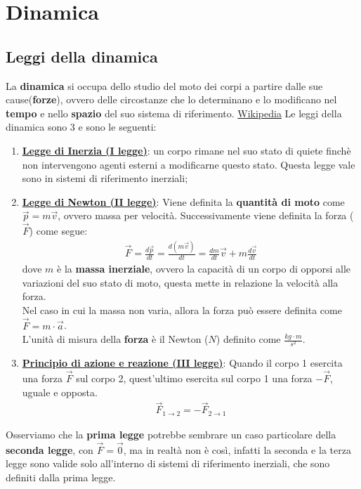 \section{Dinamica}
    \subsection{Leggi della dinamica}
        La \textbf{dinamica} si occupa dello studio del moto dei corpi a partire dalle sue cause(\textbf{forze}), ovvero delle circostanze che lo determinano e lo modificano nel \textbf{tempo} e nello \textbf{spazio} del suo sistema di riferimento. \href{https://it.wikipedia.org/wiki/Dinamica}{Wikipedia}
        Le leggi della dinamica sono 3 e sono le seguenti:
        \begin{enumerate}
            \item \underline{\textbf{Legge di Inerzia (I legge)}}: un corpo rimane nel suo stato di quiete finchè non intervengono agenti esterni a modificarne questo stato. Questa legge vale sono in sistemi di riferimento inerziali;\\
            \item \underline{\textbf{Legge di Newton (II legge)}}: \label{II_legge_dinamica}
            Viene definita la \textbf{quantità di moto} come $\vec{p}=m\vec{v}$, ovvero massa per velocità. Successivamente viene definita la forza ($\vec{F}$) come segue:
            \begin{align*}
                \vec{F}=\frac{d\vec{p}}{dt}=\frac{d(m\vec{v})}{dt}=\frac{dm}{dt}\vec{v} + m\frac{d\vec{v}}{dt}
            \end{align*}
            dove $m$ è la \textbf{massa inerziale}, ovvero la capacità di un corpo di opporsi alle variazioni del suo stato di moto, questa mette in relazione la velocità alla forza.\\
            Nel caso in cui la massa non varia, allora la forza può essere definita come $\vec{F}=m\cdot\vec{a}$.\\
            L'unità di misura della \textbf{forza} è il Newton ($N$) definito come $\frac{kg\cdot m}{s^2}$.\\
            \item \underline{\textbf{Principio di azione e reazione (III legge)}}: \label{IIILeggeDinamica} Quando il corpo 1 esercita una forza $\vec{F}$ sul corpo 2, quest'ultimo esercita sul corpo 1 una forza $-\vec{F}$, uguale e opposta.
            \begin{align*}
                \vec{F}_{1\rightarrow 2}=-\vec{F}_{2\rightarrow 1}
            \end{align*}
        \end{enumerate}
        Osserviamo che la \textbf{prima legge} potrebbe sembrare un caso particolare della \textbf{seconda legge}, con $\vec{F}=\vec{0}$, ma in realtà non è così, infatti la seconda e la terza legge sono valide solo all'interno di sistemi di riferimento inerziali, che sono definiti dalla prima legge.

